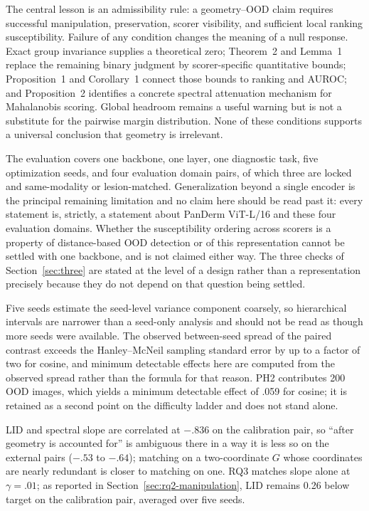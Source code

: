 \documentclass[11pt,a4paper]{article}
\begin{document}
The central lesson is an admissibility rule: a geometry--OOD claim requires successful manipulation, preservation, scorer visibility, and sufficient local ranking susceptibility. Failure of any condition changes the meaning of a null response. Exact group invariance supplies a theoretical zero; Theorem~2 and Lemma~1 replace the remaining binary judgment by scorer-specific quantitative bounds; Proposition~1 and Corollary~1 connect those bounds to ranking and AUROC; and Proposition~2 identifies a concrete spectral attenuation mechanism for Mahalanobis scoring. Global headroom remains a useful warning but is not a substitute for the pairwise margin distribution. None of these conditions supports a universal conclusion that geometry is irrelevant.

The evaluation covers one backbone, one layer, one diagnostic task, five optimization seeds, and four evaluation domain pairs, of which three are locked and same-modality or lesion-matched. Generalization beyond a single encoder is the principal remaining limitation
and no claim here should be read past it: every statement is, strictly, a
statement about PanDerm ViT-L/16 and these four evaluation domains. Whether the
susceptibility ordering across scorers is a property of distance-based OOD
detection or of this representation cannot be settled with one backbone, and is
not claimed either way. The three checks of Section~\ref{sec:three} are stated
at the level of a design rather than a representation precisely because they do
not depend on that question being settled.

Five seeds estimate the seed-level variance component coarsely, so hierarchical intervals are narrower than a seed-only analysis and should not be read as though more seeds were available. The observed between-seed spread of the paired contrast exceeds the Hanley--McNeil sampling standard error by up to a factor of two for cosine, and minimum detectable effects here are computed from the observed spread rather than the formula for that reason. PH2 contributes 200 OOD images, which yields a minimum detectable effect of .059 for cosine; it is retained as a second point on the difficulty ladder and does not stand alone.

LID and spectral slope are correlated at $-.836$ on the calibration pair, so ``after geometry is accounted for'' is ambiguous there in a way it is less so on the external pairs ($-.53$ to $-.64$); matching on a two-coordinate $G$ whose coordinates are nearly redundant is closer to matching on one. RQ3 matches slope alone at $\gamma=.01$; as reported in Section~\ref{sec:rq2-manipulation}, LID remains 0.26 below target on the calibration pair, averaged over five seeds.
\end{document}
